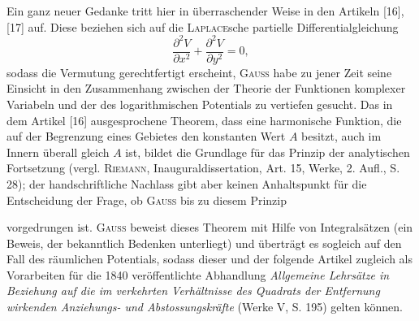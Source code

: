 Ein ganz neuer Gedanke tritt hier in überraschender Weise in den Artikeln
[16], [17] auf. Diese beziehen sich auf die \textsc{Laplace}sche partielle Differentialgleichung
\[
\frac{\partial^2 V}{\partial x^2}+\frac{\partial^2 V}{\partial y^2}=0,
\]
\noindent sodass die Vermutung gerechtfertigt erscheint, \textsc{Gauss} habe zu jener Zeit seine
Einsicht in den Zusammenhang zwischen der Theorie der Funktionen komplexer
Variabeln und der des logarithmischen Potentials zu vertiefen gesucht.
Das in dem Artikel [16] ausgesprochene Theorem, dass eine harmonische Funktion,
die auf der Begrenzung eines Gebietes den konstanten Wert \(A\) besitzt,
auch im Innern überall gleich \(A\) ist, bildet die Grundlage für das Prinzip
der analytischen Fortsetzung (vergl. \textsc{Riemann}, Inauguraldissertation, Art. 15,
Werke, 2. Aufl., S. 28); der handschriftliche Nachlass gibt aber keinen Anhaltspunkt
für die Entscheidung der Frage, ob \textsc{Gauss} bis zu diesem Prinzip
\par\clearpage{}
\noindent vorgedrungen ist. \textsc{Gauss} beweist dieses Theorem mit Hilfe von Integralsätzen
(ein Beweis, der bekanntlich Bedenken unterliegt) und überträgt es sogleich
auf den Fall des räumlichen Potentials, sodass dieser und der folgende Artikel
zugleich als Vorarbeiten für die 1840 veröffentlichte Abhandlung \textit{Allgemeine
Lehrsätze in Beziehung auf die im verkehrten Verhältnisse des Quadrats
der Entfernung wirkenden Anziehungs- und Abstossungskräfte} (Werke V, S. 195)
gelten können.

